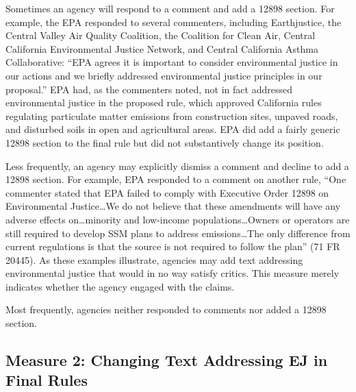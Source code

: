 \documentclass[
      12pt,
        ]{article}
\begin{document}
Sometimes an agency will respond to a comment and add a 12898 section. For example, the EPA responded to several commenters, including Earthjustice, the Central Valley Air Quality Coalition, the Coalition for Clean Air, Central California Environmental Justice Network, and Central California Asthma Collaborative: ``EPA agrees it is important to consider environmental justice in our actions and we briefly addressed environmental justice principles in our proposal.'' EPA had, as the commenters noted, not in fact addressed environmental justice in the proposed rule, which approved California rules regulating particulate matter emissions from construction sites, unpaved roads, and disturbed soils in open and agricultural areas. EPA did add a fairly generic 12898 section to the final rule but did not substantively change its position.

Less frequently, an agency may explicitly dismiss a comment and decline to add a 12898 section. For example, EPA responded to a comment on another rule, ``One commenter stated that EPA failed to comply with Executive Order 12898 on Environmental Justice\ldots We do not believe that these amendments will have any adverse effects on\ldots minority and low-income populations\ldots Owners or operators are still required to develop SSM plans to address emissions\ldots The only difference from current regulations is that the source is not required to follow the plan'' (71 FR 20445). As these examples illustrate, agencies may add text addressing environmental justice that would in no way satisfy critics. This measure merely indicates whether the agency engaged with the claims.

Most frequently, agencies neither responded to comments nor added a 12898 section.

\hypertarget{measure-2-changing-text-addressing-ej-in-final-rules}{%
\subsection{Measure 2: Changing Text Addressing EJ in Final Rules}\label{measure-2-changing-text-addressing-ej-in-final-rules}}
\end{document}
